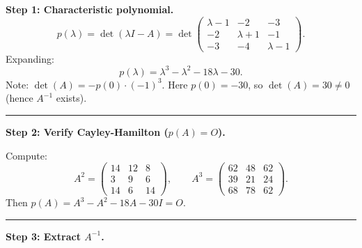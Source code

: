 \documentclass[12pt,a3paper]{article}
\begin{document}
\begin{tcolorbox}[enhanced,breakable,
  colback=cE!4,colframe=cE,boxrule=0.8pt,arc=5pt,
  title={\textbf{Answer --- Inverse via Cayley-Hamilton for
    $A=\begin{pmatrix}1&2&3\\2&-1&1\\3&4&1\end{pmatrix}$}},
  fonttitle=\bfseries\color{white},colbacktitle=cE]
 
\textbf{Step 1: Characteristic polynomial.}
\[
  p(\lambda) = \det(\lambda I - A)
  = \det\begin{pmatrix}\lambda-1&-2&-3\\-2&\lambda+1&-1\\-3&-4&\lambda-1\end{pmatrix}.
\]
Expanding:
\[
  p(\lambda) = \lambda^3 - \lambda^2 - 18\lambda - 30.
\]
Note: $\det(A) = -p(0) \cdot (-1)^3$. Here $p(0) = -30$, so $\det(A) = 30 \neq 0$
(hence $A^{-1}$ exists).
 
\medskip\textcolor{cE}{\rule{\textwidth}{0.4pt}}
 
\textbf{Step 2: Verify Cayley-Hamilton ($p(A) = O$).}
 
Compute:
\[
  A^2 = \begin{pmatrix}14&12&8\\3&9&6\\14&6&14\end{pmatrix}, \qquad
  A^3 = \begin{pmatrix}62&48&62\\39&21&24\\68&78&62\end{pmatrix}.
\]
Then $p(A) = A^3 - A^2 - 18A - 30I = O$. \checkmark
 
\medskip\textcolor{cE}{\rule{\textwidth}{0.4pt}}
 
\textbf{Step 3: Extract $A^{-1}$.}
 

\end{tcolorbox}
\end{document}
